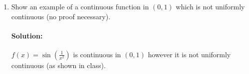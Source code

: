 \documentclass{article}
\begin{document}
\begin{enumerate}
\begin{enumerate}
\begin{proof}
                \begin{align*}
                    |y-x|&=y-x&\text{Since }y>x\\
                    &= \sqrt{\pi k} -\sqrt{\pi k-\frac{\pi}{2}}  \\
                    &= \frac{\left(\sqrt{\pi k} -\sqrt{\pi k-\frac{\pi}{2}}\right)
                    \left(\sqrt{\pi k} +\sqrt{\pi k-\frac{\pi}{2}}\right)  }
                    {\left(\sqrt{\pi k} +\sqrt{\pi k-\frac{\pi}{2}}\right) } \\
                    &= \frac{\pi k -\left({\pi k-\frac{\pi}{2}}\right)}
                    {\left(\sqrt{\pi k} +\sqrt{ \pi k-\frac{\pi}{2}}\right) } \\
                    &= \frac{\frac{\pi}{2}} {\left(\sqrt{\pi k} +\sqrt{ \pi k-\frac{\pi}{2}}\right) } \\
                    &= \frac{\pi} {2\left(\sqrt{\pi k} +\sqrt{ \pi k-\frac{\pi}{2}}\right) } \\
                    &= \frac{\pi} {2\sqrt{\pi} \left(\sqrt{k} +\sqrt{  k-\frac{1}{2}}\right) } \\
                    &< \frac{\sqrt{ \pi}} {2\left(\sqrt{k} +\sqrt{  k}\right) } \\
                    &<\frac{1}{4\sqrt{k} }\\
                    &< \frac{1}{\sqrt{k}}\\
                    &<\delta
                .\end{align*}
            \end{proof}

        \item Show an example of a continuous function in $(0,1)$ which is not uniformly
            continuous (no proof necessary).

            \paragraph{Solution:} $f(x)=\sin\left( \frac{1}{x^2} \right) $ is continuous in $(0,1)$ however
            it is not uniformly continuous (as shown in class).
    \end{enumerate}

\end{enumerate}
\end{document}
